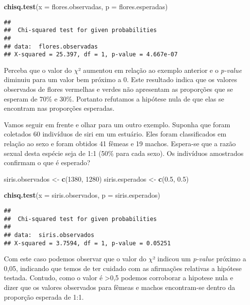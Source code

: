 \documentclass[titlepage, oneside, openany, a4paper]{book}
\newenvironment{Shaded}{\begin{snugshade}}{\end{snugshade}}
\newcommand{\DataTypeTok}[1]{\textcolor[rgb]{0.13,0.29,0.53}{#1}}
\newcommand{\DecValTok}[1]{\textcolor[rgb]{0.00,0.00,0.81}{#1}}
\newcommand{\FloatTok}[1]{\textcolor[rgb]{0.00,0.00,0.81}{#1}}
\newcommand{\KeywordTok}[1]{\textcolor[rgb]{0.13,0.29,0.53}{\textbf{#1}}}
\newcommand{\NormalTok}[1]{#1}
\newcommand{\StringTok}[1]{\textcolor[rgb]{0.31,0.60,0.02}{#1}}
\begin{document}
\begin{Shaded}
\begin{Highlighting}[]
\KeywordTok{chisq.test}\NormalTok{(}\DataTypeTok{x =}\NormalTok{ flores.observadas, }\DataTypeTok{p =}\NormalTok{ flores.esperadas)}
\end{Highlighting}
\end{Shaded}

\begin{verbatim}
## 
##  Chi-squared test for given probabilities
## 
## data:  flores.observadas
## X-squared = 25.397, df = 1, p-value = 4.667e-07
\end{verbatim}

Perceba que o valor do \(\chi\)² aumentou em relação ao exemplo anterior e o \emph{p-value} diminuiu para um valor bem próximo a 0. Este resultado indica que os valores observados de flores vermelhas e verdes não apresentam as proporções que se esperam de 70\% e 30\%. Portanto refutamos a hipótese nula de que elas se encontram nas proporções esperadas.

Vamos seguir em frente e olhar para um outro exemplo. Suponha que foram coletados 60 indivíduos de siri em um estuário. Eles foram classificados em relação ao sexo e foram obtidos 41 fêmeas e 19 machos. Espera-se que a razão sexual desta espécie seja de 1:1 (50\% para cada sexo). Os indivíduos amostrados confirmam o que é esperado?

\begin{Shaded}
\begin{Highlighting}[]
\NormalTok{siris.observados <-}\StringTok{ }\KeywordTok{c}\NormalTok{(}\DecValTok{1380}\NormalTok{, }\DecValTok{1280}\NormalTok{)}
\NormalTok{siris.esperados <-}\StringTok{ }\KeywordTok{c}\NormalTok{(}\FloatTok{0.5}\NormalTok{, }\FloatTok{0.5}\NormalTok{)}

\KeywordTok{chisq.test}\NormalTok{(}\DataTypeTok{x =}\NormalTok{ siris.observados, }\DataTypeTok{p =}\NormalTok{ siris.esperados)}
\end{Highlighting}
\end{Shaded}

\begin{verbatim}
## 
##  Chi-squared test for given probabilities
## 
## data:  siris.observados
## X-squared = 3.7594, df = 1, p-value = 0.05251
\end{verbatim}

Com este caso podemos observar que o valor do \(\chi\)² indicou um \emph{p-value} próximo a 0,05, indicando que temos de ter cuidado com as afirmações relativas a hipótese testada. Contudo, como o valor é \textgreater{}0,5 podemos corroborar a hipotese nula e dizer que os valores observados para fêmeas e machos encontram-se dentro da proporção esperada de 1:1.
\end{document}
